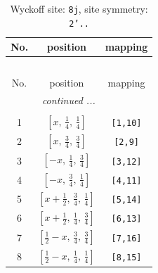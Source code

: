\documentclass[fleqn,8pt]{jsarticle}
\begin{document}
\begin{longtable}{ccc}
\caption{Wyckoff site: {\tt 8j}, site symmetry: {\tt 2'..}}
 \\
 \hline \hline
No. & position & mapping \\ \hline \endfirsthead

\multicolumn{2}{l}{\tablename\ \thetable{}} \\
 \hline \hline
No. & position & mapping \\ \hline \endhead

 \hline \hline
\multicolumn{2}{r}{\footnotesize\it continued ...} \\ \endfoot

 \hline \hline
\multicolumn{2}{r}{} \\ \endlastfoot

1 & $\left[ x,\, \frac{1}{4},\, \frac{1}{4} \right]$ & {\tt [1,10]} \\ \hline
2 & $\left[ x,\, \frac{3}{4},\, \frac{3}{4} \right]$ & {\tt [2,9]} \\ \hline
3 & $\left[ - x,\, \frac{1}{4},\, \frac{3}{4} \right]$ & {\tt [3,12]} \\ \hline
4 & $\left[ - x,\, \frac{3}{4},\, \frac{1}{4} \right]$ & {\tt [4,11]} \\ \hline
5 & $\left[ x + \frac{1}{2},\, \frac{3}{4},\, \frac{1}{4} \right]$ & {\tt [5,14]} \\ \hline
6 & $\left[ x + \frac{1}{2},\, \frac{1}{4},\, \frac{3}{4} \right]$ & {\tt [6,13]} \\ \hline
7 & $\left[ \frac{1}{2} - x,\, \frac{3}{4},\, \frac{3}{4} \right]$ & {\tt [7,16]} \\ \hline
8 & $\left[ \frac{1}{2} - x,\, \frac{1}{4},\, \frac{1}{4} \right]$ & {\tt [8,15]} \\
\end{longtable}
\renewcommand{\arraystretch}{1.2}
\end{document}
